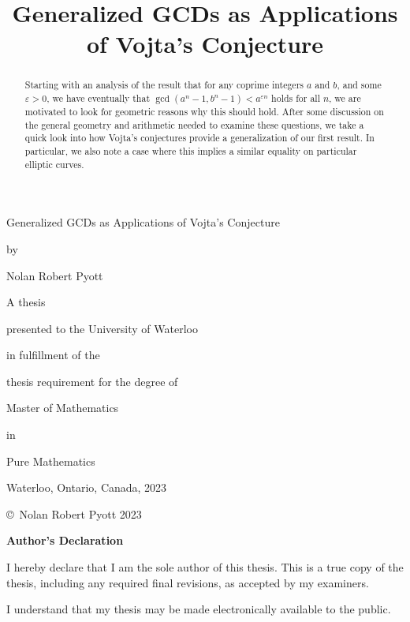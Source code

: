 \documentclass[12pt, leqno]{article}
\begin{document}
\begin{titlepage}
\begin{center}

\vspace*{4cm}
\large
\title{Generalized GCDs as Applications of Vojta's Conjecture}
Generalized GCDs as Applications of Vojta's Conjecture

\normalsize
by

Nolan Robert Pyott

\vfill

A thesis

presented to the University of Waterloo

in fulfillment of the

thesis requirement for the degree of

Master of Mathematics

in

Pure Mathematics

\vfill

Waterloo, Ontario, Canada, 2023

\copyright\ Nolan Robert Pyott 2023

\vspace*{2cm}

\end{center}
\end{titlepage}

\newpage

\setcounter{page}{2}

\begin{center}
    \textbf{Author's Declaration}
\end{center}


I hereby declare that I am the sole author of this thesis. This is a true copy of
the thesis, including any required final revisions, as accepted by my examiners.

I understand that my thesis may be made electronically available to the public.

\newpage

\begin{abstract}
Starting with an analysis of the result that for any coprime integers $a$ and $b$,
and some $\varepsilon > 0$,
we have eventually that $\gcd(a^n - 1, b^n - 1) < a^{\varepsilon n}$ holds for all $n$,
we are motivated to look for geometric reasons why this should hold.
After some discussion on the general geometry and arithmetic needed to examine these questions,
we take a quick look into how Vojta's conjectures provide a generalization of our first result.
In particular, we also note a case where this implies a similar equality on particular elliptic curves.
\end{abstract}
\end{document}

